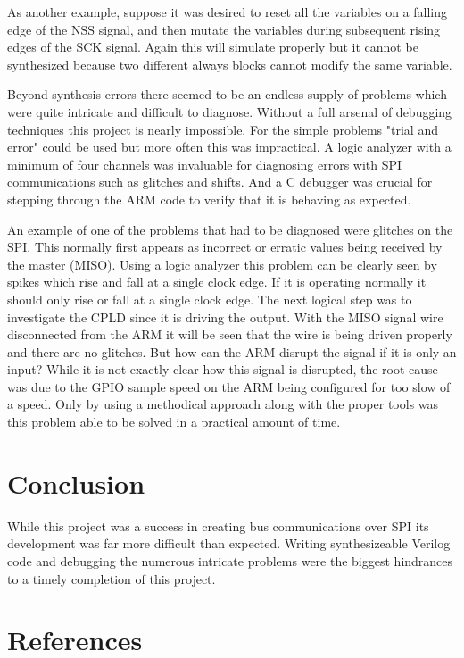 \documentclass{article}
\begin{document}
As another example, suppose it was desired to reset all the variables on
a falling edge of the NSS signal, and then mutate the variables during
subsequent rising edges of the SCK signal.
Again this will simulate properly but it cannot be synthesized because
two different always blocks cannot modify the same variable.

Beyond synthesis errors there seemed to be an endless supply of problems
which were quite intricate and difficult to diagnose.
Without a full arsenal of debugging techniques this project is nearly impossible.
For the simple problems "trial and error" could be used but more
often this was impractical.
A logic analyzer with a minimum of four channels was invaluable for
diagnosing errors with SPI communications such as glitches and shifts.
And a C debugger was crucial for stepping through the ARM code
to verify that it is behaving as expected.

An example of one of the problems that had to be diagnosed were
glitches on the SPI.
This normally first appears as incorrect or erratic values being
received by the master (MISO).
Using a logic analyzer this problem can be clearly seen by spikes
which rise and fall at a single clock edge.
If it is operating normally it should only rise or fall at a single clock edge.
The next logical step was to investigate the CPLD since it is driving the
output.
With the MISO signal wire disconnected from the ARM it will be seen that
the wire is being driven properly and there are no glitches.
But how can the ARM disrupt the signal if it is only an input?
While it is not exactly clear how this signal is disrupted, the root cause
was due to the GPIO sample speed on the ARM being configured for too
slow of a speed.
Only by using a methodical approach along with the proper tools was this
problem able to be solved in a practical amount of time.


\section{Conclusion}

While this project was a success in creating bus communications over SPI
its development was far more difficult than expected.
Writing synthesizeable Verilog code and debugging the numerous intricate
problems were the biggest hindrances to a timely completion of this project.


\clearpage

\pagebreak
\renewcommand*{\refname}{\vspace{-8mm}}
\section{References}
%


\end{document}
